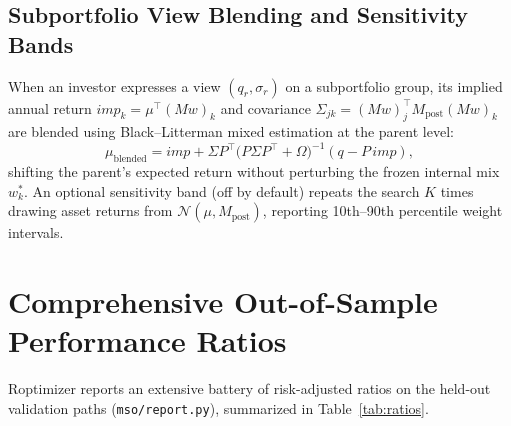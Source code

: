 \documentclass[11pt]{article}
\begin{document}
\subsection{Subportfolio View Blending and Sensitivity Bands}
When an investor expresses a view $(q_r, \sigma_r)$ on a subportfolio group, its implied annual return
$imp_k = \mu^{\top} (M w)_k$ and covariance $\Sigma_{jk} = (M w)_j^{\top} M_{\mathrm{post}} (M w)_k$ are blended
using Black--Litterman mixed estimation at the parent level:
\begin{equation}
\mu_{\mathrm{blended}} = imp + \Sigma P^{\top}\big(P \Sigma P^{\top} + \Omega\big)^{-1}(q - P\,imp),
\end{equation}
shifting the parent's expected return without perturbing the frozen internal mix $w_k^*$.
An optional sensitivity band (off by default) repeats the search $K$ times drawing asset returns from $\mathcal{N}(\mu, M_{\mathrm{post}})$,
reporting 10th--90th percentile weight intervals.

\section{Comprehensive Out-of-Sample Performance Ratios}
Roptimizer reports an extensive battery of risk-adjusted ratios on the held-out validation paths
(\texttt{mso/report.py}), summarized in Table~\ref{tab:ratios}.
\end{document}
